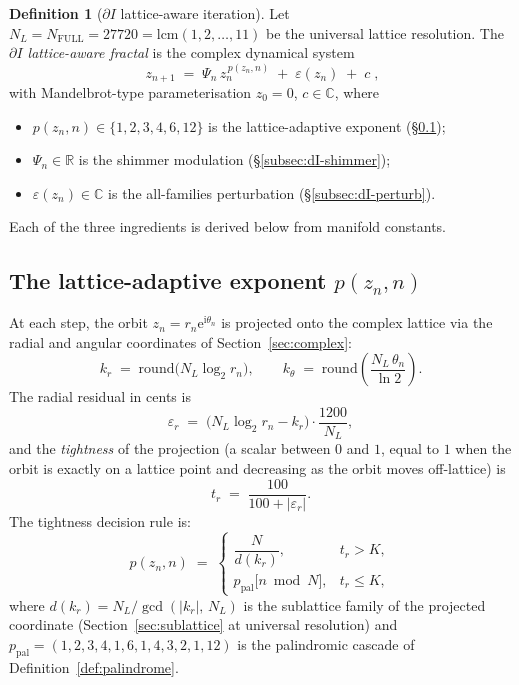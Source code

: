 \documentclass[11pt,a4paper]{article}
\theoremstyle{definition}
\newtheorem{definition}[theorem]{Definition}
\theoremstyle{remark}
\newcommand{\R}{\mathbb{R}}
\newcommand{\C}{\mathbb{C}}
\begin{document}
\begin{definition}[$\partial I$ lattice-aware iteration]\label{def:dI-iteration}
Let $N_{L}=N_{\mathrm{FULL}}=27720=\mathrm{lcm}(1,2,\ldots,11)$ be the universal lattice resolution. The \emph{$\partial I$ lattice-aware fractal} is the complex dynamical system
\[
\boxed{\;z_{n+1} \;=\; \Psi_{n}\, z_{n}^{\,p(z_{n},n)} \;+\; \varepsilon(z_{n}) \;+\; c\;,}
\]
with Mandelbrot-type parameterisation $z_{0}=0$, $c\in\C$, where
\begin{itemize}[leftmargin=*]
\item $p(z_{n},n)\in\{1,2,3,4,6,12\}$ is the lattice-adaptive exponent (\S\ref{subsec:dI-exponent});
\item $\Psi_{n}\in\R$ is the shimmer modulation (\S\ref{subsec:dI-shimmer});
\item $\varepsilon(z_{n})\in\C$ is the all-families perturbation (\S\ref{subsec:dI-perturb}).
\end{itemize}
\end{definition}

Each of the three ingredients is derived below from manifold constants.

\subsection{The lattice-adaptive exponent $p(z_{n},n)$}\label{subsec:dI-exponent}

At each step, the orbit $z_{n}=r_{n}\mathrm{e}^{\mathrm{i}\theta_{n}}$ is projected onto the complex lattice via the radial and angular coordinates of Section~\ref{sec:complex}:
\begin{equation}
k_{r} \;=\; \mathrm{round}\bigl(N_{L}\log_{2}r_{n}\bigr), \qquad
k_{\theta} \;=\; \mathrm{round}\!\left(\frac{N_{L}\,\theta_{n}}{\ln 2}\right).
\end{equation}
The radial residual in cents is
\begin{equation}
\varepsilon_{r} \;=\; \bigl(N_{L}\log_{2}r_{n} - k_{r}\bigr)\cdot\frac{1200}{N_{L}},
\label{eq:dI-eps}
\end{equation}
and the \emph{tightness} of the projection (a scalar between $0$ and $1$, equal to $1$ when the orbit is exactly on a lattice point and decreasing as the orbit moves off-lattice) is
\begin{equation}
t_{r} \;=\; \frac{100}{100+|\varepsilon_{r}|}.
\label{eq:dI-tightness}
\end{equation}
The tightness decision rule is:
\[
p(z_{n},n) \;=\; \begin{cases}
\dfrac{N}{d(k_{r})}, & t_{r} > K, \\[0.8em]
p_{\mathrm{pal}}\!\bigl[n\bmod N\bigr], & t_{r} \leq K,
\end{cases}
\]
where $d(k_{r}) = N_{L}/\gcd(|k_{r}|,\,N_{L})$ is the sublattice family of the projected coordinate (Section~\ref{sec:sublattice} at universal resolution) and $p_{\mathrm{pal}}=(1,2,3,4,1,6,1,4,3,2,1,12)$ is the palindromic cascade of Definition~\ref{def:palindrome}.
\end{document}
